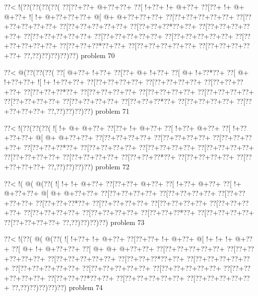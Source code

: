 \vbox{\vbox{\goo
\0??<\- !(\0??(\0??(\0??(\0??(
\0??[\0??+\0??+\- @+\0??+\0??+
\0??[\- !+\0??+\- !+\- @+\0??+
\0??[\0??+\- !+\- @+\- @+\0??+
\- ![\- !+\- @+\0??+\0??+\0??+
\- @[\- @+\- @+\0??+\0??+\0??+
\0??[\0??+\0??+\0??+\0??+\0??+
\0??[\0??+\0??+\0??+\0??+\0??+
\0??[\0??+\0??+\0??+\0??+\0??+
\0??[\0??+\0??+\0??*\0??+\0??+
\0??[\0??+\0??+\0??+\0??+\0??+
\0??[\0??+\0??+\0??+\0??+\0??+
\0??[\0??+\0??+\0??+\0??+\0??+
\0??[\0??+\0??+\0??+\0??+\0??+
\0??[\0??+\0??+\0??+\0??+\0??+
\0??[\0??+\0??+\0??*\0??+\0??+
\0??[\0??+\0??+\0??+\0??+\0??+
\0??[\0??+\0??+\0??+\0??+\0??+
\0??,\0??)\0??)\0??)\0??)\0??)
}
\hfil problem 70\hfil\break
}

\vbox{\vbox{\goo
\0??<\- @(\0??(\0??(\0??(
\0??[\- @+\0??+\- !+\0??+
\0??[\0??+\- @+\- !+\0??+
\0??[\- @+\- !+\0??*\0??+
\0??[\- @+\- !+\0??+\0??+
\- ![\- !+\- !+\0??+\0??+
\0??[\0??+\0??+\0??+\0??+
\0??[\0??+\0??+\0??+\0??+
\0??[\0??+\0??+\0??+\0??+
\0??[\0??+\0??+\0??*\0??+
\0??[\0??+\0??+\0??+\0??+
\0??[\0??+\0??+\0??+\0??+
\0??[\0??+\0??+\0??+\0??+
\0??[\0??+\0??+\0??+\0??+
\0??[\0??+\0??+\0??+\0??+
\0??[\0??+\0??+\0??*\0??+
\0??[\0??+\0??+\0??+\0??+
\0??[\0??+\0??+\0??+\0??+
\0??,\0??)\0??)\0??)\0??)
}
\hfil problem 71\hfil\break
}

\vbox{\vbox{\goo
\0??<\- !(\0??(\0??(\0??(
\- ![\- !+\- @+\- @+\0??+
\0??[\0??+\- !+\- @+\0??+
\0??[\- !+\0??+\- @+\0??+
\0??[\- !+\0??+\0??+\0??+
\- @[\- @+\- @+\0??+\0??+
\0??[\0??+\0??+\0??+\0??+
\0??[\0??+\0??+\0??+\0??+
\0??[\0??+\0??+\0??+\0??+
\0??[\0??+\0??+\0??*\0??+
\0??[\0??+\0??+\0??+\0??+
\0??[\0??+\0??+\0??+\0??+
\0??[\0??+\0??+\0??+\0??+
\0??[\0??+\0??+\0??+\0??+
\0??[\0??+\0??+\0??+\0??+
\0??[\0??+\0??+\0??*\0??+
\0??[\0??+\0??+\0??+\0??+
\0??[\0??+\0??+\0??+\0??+
\0??,\0??)\0??)\0??)\0??)
}
\hfil problem 72\hfil\break
}

\vbox{\vbox{\goo
\0??<\- !(\- @(\- @(\0??(
\- ![\- !+\- !+\- @+\0??+
\0??[\0??+\0??+\- @+\0??+
\0??[\- !+\0??+\- @+\0??+
\0??[\- !+\- @+\0??+\0??+
\- @[\- @+\- @+\0??+\0??+
\0??[\0??+\0??+\0??+\0??+
\0??[\0??+\0??+\0??+\0??+
\0??[\0??+\0??+\0??+\0??+
\0??[\0??+\0??+\0??*\0??+
\0??[\0??+\0??+\0??+\0??+
\0??[\0??+\0??+\0??+\0??+
\0??[\0??+\0??+\0??+\0??+
\0??[\0??+\0??+\0??+\0??+
\0??[\0??+\0??+\0??+\0??+
\0??[\0??+\0??+\0??*\0??+
\0??[\0??+\0??+\0??+\0??+
\0??[\0??+\0??+\0??+\0??+
\0??,\0??)\0??)\0??)\0??)
}
\hfil problem 73\hfil\break
}

\vbox{\vbox{\goo
\0??<\- !(\0??(\- @(\- @(\0??(
\- ![\- !+\0??+\- !+\- @+\0??+
\0??[\0??+\0??+\- !+\- @+\0??+
\- @[\- !+\- !+\- !+\- @+\0??+
\0??[\- @+\- !+\- @+\0??+\0??+
\0??[\- @+\- @+\- @+\0??+\0??+
\0??[\0??+\0??+\0??+\0??+\0??+
\0??[\0??+\0??+\0??+\0??+\0??+
\0??[\0??+\0??+\0??+\0??+\0??+
\0??[\0??+\0??+\0??*\0??+\0??+
\0??[\0??+\0??+\0??+\0??+\0??+
\0??[\0??+\0??+\0??+\0??+\0??+
\0??[\0??+\0??+\0??+\0??+\0??+
\0??[\0??+\0??+\0??+\0??+\0??+
\0??[\0??+\0??+\0??+\0??+\0??+
\0??[\0??+\0??+\0??*\0??+\0??+
\0??[\0??+\0??+\0??+\0??+\0??+
\0??[\0??+\0??+\0??+\0??+\0??+
\0??,\0??)\0??)\0??)\0??)\0??)
}
\hfil problem 74\hfil\break
}

